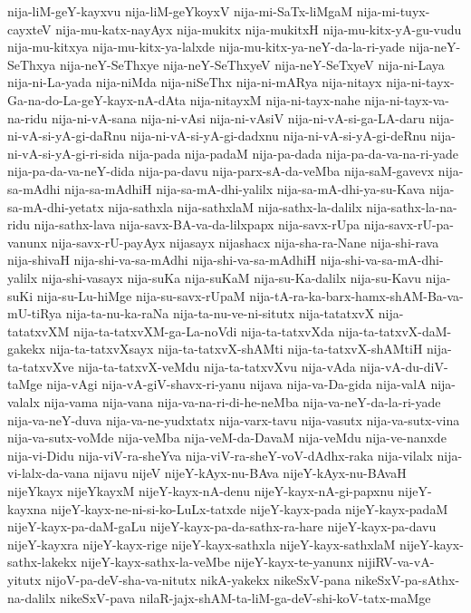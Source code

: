 {nija-liM-geY-kayxvu
nija-liM-geYkoyxV
nija-mi-SaTx-liMgaM
nija-mi-tuyx-cayxteV
nija-mu-katx-nayAyx
nija-mukitx
nija-mukitxH
nija-mu-kitx-yA-gu-vudu
nija-mu-kitxya
nija-mu-kitx-ya-lalxde
nija-mu-kitx-ya-neY-da-la-ri-yade
nija-neY-SeThxya
nija-neY-SeThxye
nija-neY-SeThxyeV
nija-neY-SeTxyeV
nija-ni-Laya
nija-ni-La-yada
nija-niMda
nija-niSeThx
nija-ni-mARya
nija-nitayx
nija-ni-tayx-Ga-na-do-La-geY-kayx-nA-dAta
nija-nitayxM
nija-ni-tayx-nahe
nija-ni-tayx-va-na-ridu
nija-ni-vA-sana
nija-ni-vAsi
nija-ni-vAsiV
nija-ni-vA-si-ga-LA-daru
nija-ni-vA-si-yA-gi-daRnu
nija-ni-vA-si-yA-gi-dadxnu
nija-ni-vA-si-yA-gi-deRnu
nija-ni-vA-si-yA-gi-ri-sida
nija-pada
nija-padaM
nija-pa-dada
nija-pa-da-va-na-ri-yade
nija-pa-da-va-neY-dida
nija-pa-davu
nija-parx-sA-da-veMba
nija-saM-gavevx
nija-sa-mAdhi
nija-sa-mAdhiH
nija-sa-mA-dhi-yalilx
nija-sa-mA-dhi-ya-su-Kava
nija-sa-mA-dhi-yetatx
nija-sathxla
nija-sathxlaM
nija-sathx-la-dalilx
nija-sathx-la-na-ridu
nija-sathx-lava
nija-savx-BA-va-da-lilxpapx
nija-savx-rUpa
nija-savx-rU-pa-vanunx
nija-savx-rU-payAyx
nijasayx
nijashacx
nija-sha-ra-Nane
nija-shi-rava
nija-shivaH
nija-shi-va-sa-mAdhi
nija-shi-va-sa-mAdhiH
nija-shi-va-sa-mA-dhi-yalilx
nija-shi-vasayx
nija-suKa
nija-suKaM
nija-su-Ka-dalilx
nija-su-Kavu
nija-suKi
nija-su-Lu-hiMge
nija-su-savx-rUpaM
nija-tA-ra-ka-barx-hamx-shAM-Ba-va-mU-tiRya
nija-ta-nu-ka-raNa
nija-ta-nu-ve-ni-situtx
nija-tatatxvX
nija-tatatxvXM
nija-ta-tatxvXM-ga-La-noVdi
nija-ta-tatxvXda
nija-ta-tatxvX-daM-gakekx
nija-ta-tatxvXsayx
nija-ta-tatxvX-shAMti
nija-ta-tatxvX-shAMtiH
nija-ta-tatxvXve
nija-ta-tatxvX-veMdu
nija-ta-tatxvXvu
nija-vAda
nija-vA-du-diV-taMge
nija-vAgi
nija-vA-giV-shavx-ri-yanu
nijava
nija-va-Da-gida
nija-valA
nija-valalx
nija-vama
nija-vana
nija-va-na-ri-di-he-neMba
nija-va-neY-da-la-ri-yade
nija-va-neY-duva
nija-va-ne-yudxtatx
nija-varx-tavu
nija-vasutx
nija-va-sutx-vina
nija-va-sutx-voMde
nija-veMba
nija-veM-da-DavaM
nija-veMdu
nija-ve-nanxde
nija-vi-Didu
nija-viV-ra-sheYva
nija-viV-ra-sheY-voV-dAdhx-raka
nija-vilalx
nija-vi-lalx-da-vana
nijavu
nijeV
nijeY-kAyx-nu-BAva
nijeY-kAyx-nu-BAvaH
nijeYkayx
nijeYkayxM
nijeY-kayx-nA-denu
nijeY-kayx-nA-gi-papxnu
nijeY-kayxna
nijeY-kayx-ne-ni-si-ko-LuLx-tatxde
nijeY-kayx-pada
nijeY-kayx-padaM
nijeY-kayx-pa-daM-gaLu
nijeY-kayx-pa-da-sathx-ra-hare
nijeY-kayx-pa-davu
nijeY-kayxra
nijeY-kayx-rige
nijeY-kayx-sathxla
nijeY-kayx-sathxlaM
nijeY-kayx-sathx-lakekx
nijeY-kayx-sathx-la-veMbe
nijeY-kayx-te-yanunx
nijiRV-va-vA-yitutx
nijoV-pa-deV-sha-va-nitutx
nikA-yakekx
nikeSxV-pana
nikeSxV-pa-sAthx-na-dalilx
nikeSxV-pava
nilaR-jajx-shAM-ta-liM-ga-deV-shi-koV-tatx-maMge
}
